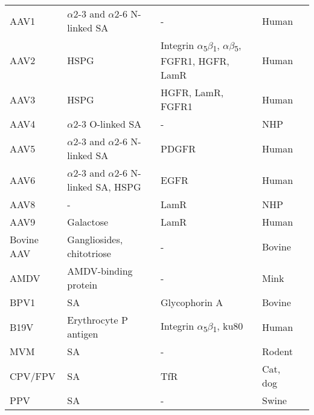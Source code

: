 \begin{small}
\begin{center}
\begin{longtable}{P{0.7in} P{1.8in} P{1.47in} P{0.6in} P{.95in}}
AAV1 & $\alpha$2-3 and $\alpha$2-6 N-linked SA & - & Human & \cite{pmid16940521} \\
AAV2 & HSPG & Integrin $\alpha$\textsubscript{5}$\beta$\textsubscript{1}, $\alpha$\textsubscript{}$\beta$\textsubscript{5}, FGFR1, HGFR, LamR & Human & \cite{pmid16973587, pmid15596854, pmid9883842, pmid9883843, pmid9445046, pmid16940508} \\
AAV3 & HSPG & HGFR, LamR, FGFR1 & Human & \cite{pmid16973587, pmid20545554, pmid16195782} \\
AAV4 & $\alpha$2-3 O-linked SA & - & NHP & \cite{pmid11435568} \\
AAV5 & $\alpha$2-3 and $\alpha$2-6 N-linked SA & PDGFR & Human & \cite{pmid14502277, pmid16409121, pmid11262413, pmid11435568} \\   
AAV6 & $\alpha$2-3 and $\alpha$2-6 N-linked SA, HSPG & EGFR & Human & \cite{pmid20473307, pmid16940521, pmid16943302} \\  
AAV8 & - & LamR & NHP & \cite{pmid16973587} \\
AAV9 & Galactose & LamR & Human & \cite{pmid16973587, pmid21576824, pmid21330365} \\
Bovine AAV & Gangliosides, chitotriose & - & Bovine & \cite{pmid20231878, pmid16699032} \\
AMDV & AMDV-binding protein & - & Mink & \cite{pmid10196278} \\
BPV1 & SA & Glycophorin A & Bovine & \cite{pmid15750863, pmid9747725} \\
B19V & Erythrocyte P antigen & Integrin $\alpha$\textsubscript{5}$\beta$\textsubscript{1}, ku80 & Human & \cite{pmid8211117, pmid15661151, pmid12907437, pmid16076874, weigel} \\
MVM & SA & - & Rodent & \cite{pmid3296697, pmid15229399, pmid16822863} \\
CPV/FPV & SA & TfR & Cat, dog & \cite{pmid11264378, pmid12525605} \\
PPV & SA & - & Swine & \cite{pmid20484503} \\[1.1ex]    
\end{longtable}
\end{center} 
\end{small}


